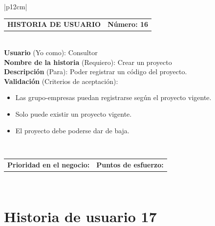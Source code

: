 \documentclass[11pt,letterpaper]{report}
\begin{document}
	\begin{center}	
		\begin{tabular}{|p{12cm}|}
			\hline
			\begin{tabular}{c|c}
				\textbf{HISTORIA DE USUARIO} & \textbf{Número: 16} \\
			\end{tabular} \\ \hline
			\textbf{Usuario} (Yo como): Consultor \\ \hline
			\textbf{Nombre de la historia} (Requiero): Crear un proyecto \\ \hline
			\textbf{Descripción} (Para): Poder registrar un código del proyecto. \\ \hline
			\textbf{Validación} (Criterios de aceptación): \\
			\begin{minipage}{12cm}
				\begin{itemize}
					\item Las grupo-empresas puedan registrarse según el proyecto vigente.
					\item Solo puede existir un proyecto vigente.
					\item El proyecto debe poderse dar de baja.
				\end{itemize}
			\end{minipage} \\ \hline
			\begin{tabular}{c|c}
				\textbf{Prioridad en el negocio: } & \textbf{Puntos de esfuerzo: } \\
			\end{tabular} \\ \hline
		\end{tabular}
	\end{center}
	
	\section{Historia de usuario 17}
	
\end{document}
